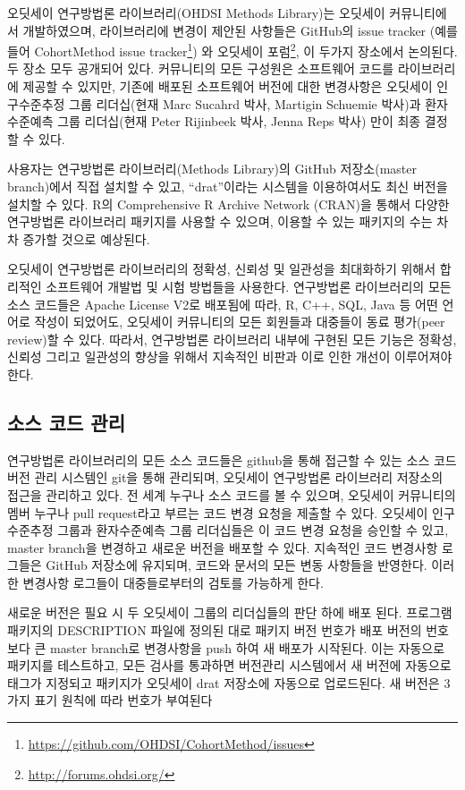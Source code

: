 \documentclass[11pt]{book}
\let\rmarkdownfootnote\footnote%
\def\footnote{\protect\rmarkdownfootnote}
\theoremstyle{definition}
\theoremstyle{definition}
\theoremstyle{definition}
\theoremstyle{remark}
\begin{document}
오딧세이 연구방법론 라이브러리(OHDSI Methods Library)는 오딧세이
커뮤니티에서 개발하였으며, 라이브러리에 변경이 제안된 사항들은 GitHub의
issue tracker (예를 들어 CohortMethod issue tracker\footnote{\url{https://github.com/OHDSI/CohortMethod/issues}})
와 오딧세이 포럼\footnote{\url{http://forums.ohdsi.org/}}, 이 두가지
장소에서 논의된다. 두 장소 모두 공개되어 있다. 커뮤니티의 모든 구성원은
소프트웨어 코드를 라이브러리에 제공할 수 있지만, 기존에 배포된
소프트웨어 버전에 대한 변경사항은 오딧세이 인구수준추정 그룹 리더십(현재
Marc Sucahrd 박사, Martigin Schuemie 박사)과 환자수준예측 그룹
리더십(현재 Peter Rijinbeek 박사, Jenna Reps 박사) 만이 최종 결정할 수
있다.

사용자는 연구방법론 라이브러리(Methods Library)의 GitHub 저장소(master
branch)에서 직접 설치할 수 있고, ``drat''이라는 시스템을 이용하여서도
최신 버전을 설치할 수 있다. R의 Comprehensive R Archive Network (CRAN)을
통해서 다양한 연구방법론 라이브러리 패키지를 사용할 수 있으며, 이용할 수
있는 패키지의 수는 차차 증가할 것으로 예상된다.

오딧세이 연구방법론 라이브러리의 정확성, 신뢰성 및 일관성을 최대화하기
위해서 합리적인 소프트웨어 개발법 및 시험 방법들을 사용한다. 연구방법론
라이브러리의 모든 소스 코드들은 Apache License V2로 배포됨에 따라, R,
C++, SQL, Java 등 어떤 언어로 작성이 되었어도, 오딧세이 커뮤니티의 모든
회원들과 대중들이 동료 평가(peer review)할 수 있다. 따라서, 연구방법론
라이브러리 내부에 구현된 모든 기능은 정확성, 신뢰성 그리고 일관성의
향상을 위해서 지속적인 비판과 이로 인한 개선이 이루어져야 한다.

\subsection{소스 코드 관리}\label{--}

연구방법론 라이브러리의 모든 소스 코드들은 github을 통해 접근할 수 있는
소스 코드 버전 관리 시스템인 git을 통해 관리되며, 오딧세이 연구방법론
라이브러리 저장소의 접근을 관리하고 있다. 전 세계 누구나 소스 코드를 볼
수 있으며, 오딧세이 커뮤니티의 멤버 누구나 pull request라고 부르는 코드
변경 요청을 제출할 수 있다. 오딧세이 인구수준추정 그룹과 환자수준예측
그룹 리더십들은 이 코드 변경 요청을 승인할 수 있고, master branch을
변경하고 새로운 버전을 배포할 수 있다. 지속적인 코드 변경사항 로그들은
GitHub 저장소에 유지되며, 코드와 문서의 모든 변동 사항들을 반영한다.
이러한 변경사항 로그들이 대중들로부터의 검토를 가능하게 한다.

새로운 버전은 필요 시 두 오딧세이 그룹의 리더십들의 판단 하에 배포 된다.
프로그램 패키지의 DESCRIPTION 파일에 정의된 대로 패키지 버전 번호가 배포
버전의 번호보다 큰 master branch로 변경사항을 push 하여 새 배포가
시작된다. 이는 자동으로 패키지를 테스트하고, 모든 검사를 통과하면
버전관리 시스템에서 새 버전에 자동으로 태그가 지정되고 패키지가 오딧세이
drat 저장소에 자동으로 업로드된다. 새 버전은 3가지 표기 원칙에 따라
번호가 부여된다
\end{document}
